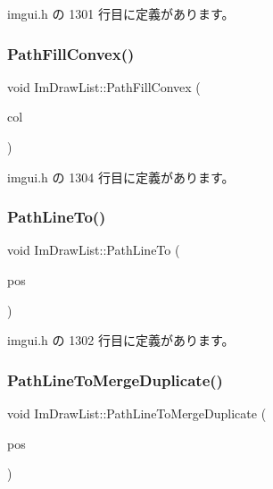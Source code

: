  imgui.\+h の 1301 行目に定義があります。

\mbox{\label{struct_im_draw_list_aea9301cb99ebf4b27f5d3959017567c9}} 
\subsubsection{\texorpdfstring{Path\+Fill\+Convex()}{PathFillConvex()}}
{\footnotesize\ttfamily void Im\+Draw\+List\+::\+Path\+Fill\+Convex (\begin{DoxyParamCaption}\item[{\mbox{\hyperlink{imgui_8h_a118cff4eeb8d00e7d07ce3d6460eed36}{Im\+U32}}}]{col }\end{DoxyParamCaption})\hspace{0.3cm}{\ttfamily [inline]}}



 imgui.\+h の 1304 行目に定義があります。

\mbox{\label{struct_im_draw_list_a828d944325ed58d8b57abd3647bffaaf}} 
\subsubsection{\texorpdfstring{Path\+Line\+To()}{PathLineTo()}}
{\footnotesize\ttfamily void Im\+Draw\+List\+::\+Path\+Line\+To (\begin{DoxyParamCaption}\item[{const \mbox{\hyperlink{struct_im_vec2}{Im\+Vec2}} \&}]{pos }\end{DoxyParamCaption})\hspace{0.3cm}{\ttfamily [inline]}}



 imgui.\+h の 1302 行目に定義があります。

\mbox{\label{struct_im_draw_list_aa3dd11945fb62495f8b9e1392ed724e3}} 
\subsubsection{\texorpdfstring{Path\+Line\+To\+Merge\+Duplicate()}{PathLineToMergeDuplicate()}}
{\footnotesize\ttfamily void Im\+Draw\+List\+::\+Path\+Line\+To\+Merge\+Duplicate (\begin{DoxyParamCaption}\item[{const \mbox{\hyperlink{struct_im_vec2}{Im\+Vec2}} \&}]{pos }\end{DoxyParamCaption})\hspace{0.3cm}{\ttfamily [inline]}}



